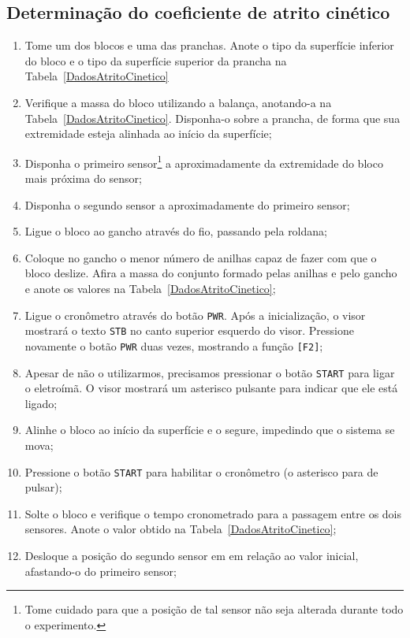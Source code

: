 \subsection{Determinação do coeficiente de atrito cinético}
\begin{enumerate}
    \item Tome um dos blocos e uma das pranchas. Anote o tipo da superfície inferior do bloco e o tipo da superfície superior da prancha na Tabela~\ref{DadosAtritoCinetico}
    \item Verifique a massa do bloco utilizando a balança, anotando-a na Tabela~\ref{DadosAtritoCinetico}. Disponha-o sobre a prancha, de forma que sua extremidade esteja alinhada ao início da superfície;
    \item Disponha o primeiro sensor\footnote{Tome cuidado para que a posição de tal sensor não seja alterada durante todo o experimento.} a aproximadamente  da extremidade do bloco mais próxima do sensor;
    \item Disponha o segundo sensor a aproximadamente  do primeiro sensor;
    \item Ligue o bloco ao gancho através do fio, passando pela roldana;
    \item Coloque no gancho o menor número de anilhas capaz de fazer com que o bloco deslize. Afira a massa do conjunto formado pelas anilhas e pelo gancho e anote os valores na Tabela~\ref{DadosAtritoCinetico};
    \item Ligue o cronômetro através do botão \texttt{PWR}. Após a inicialização, o visor mostrará o texto \texttt{STB} no canto superior esquerdo do visor. Pressione novamente o botão \texttt{PWR} duas vezes, mostrando a função \texttt{[F2]};
    \item Apesar de não o utilizarmos, precisamos pressionar o botão \texttt{START} para ligar o eletroímã. O visor mostrará um asterisco pulsante para indicar que ele está ligado;
    \item Alinhe o bloco ao início da superfície e o segure, impedindo que o sistema se mova;\label{Item:LoopAtritoCineticoInicio}
    \item Pressione o botão \texttt{START} para habilitar o cronômetro (o asterisco para de pulsar);
    \item Solte o bloco e verifique o tempo cronometrado para a passagem entre os dois sensores. Anote o valor obtido na Tabela~\ref{DadosAtritoCinetico};
    \item Desloque a posição do segundo sensor em  em relação ao valor inicial, afastando-o do primeiro sensor;\label{Item:LoopAtritoCineticoFim}

\end{enumerate}
